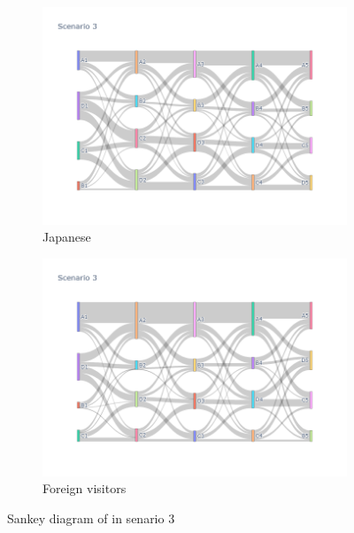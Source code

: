 \begin{figure}[h]
  \begin{subfigure}{0.5\textwidth}
    \centering
    \includegraphics[width=\textwidth]{Figure/Figure26c.jpg}
    \caption{Japanese}
  \end{subfigure}
  \begin{subfigure}{0.5\textwidth}
    \centering
    \includegraphics[width=\linewidth]{Figure/Figure27c.jpg}
    \caption{Foreign visitors}
  \end{subfigure}
  \caption{Sankey diagram of in senario 3 }
  \label{fig26c}
\end{figure}


